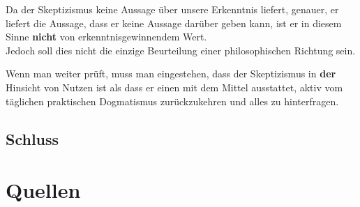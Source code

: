\documentclass[11pt,a4paper]{article}
\begin{document}
Da der Skeptizismus keine Aussage über unsere Erkenntnis liefert, genauer, er liefert die Aussage, dass er keine Aussage darüber geben kann, ist er in diesem Sinne \textbf{nicht} von erkenntnisgewinnendem Wert.\\
Jedoch soll dies nicht die einzige Beurteilung einer philosophischen Richtung sein. 




Wenn man weiter prüft, muss man eingestehen, dass der Skeptizismus in \textbf{der} Hinsicht von Nutzen ist als dass er einen mit dem Mittel ausstattet, aktiv vom täglichen praktischen Dogmatismus zurückzukehren und alles zu hinterfragen.
	\subsection{Schluss}





\section*{Quellen}
\printbibliography
\end{document}
